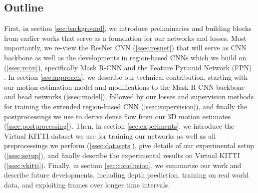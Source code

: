 \subsection{Outline}
First, in section \ref{sec:background}, we introduce preliminaries and building
blocks from earlier works that serve as a foundation for our networks and losses.
Most importantly, we re-view the ResNet CNN (\ref{ssec:resnet}) that will serve as CNN backbone
as well as the developments in region-based CNNs which we build on (\ref{ssec:rcnn}),
specifically Mask R-CNN and the Feature Pyramid Network (FPN) \cite{FPN}.
In section \ref{sec:approach}, we describe our technical contribution, starting
with our motion estimation model and modifications to the Mask R-CNN backbone and head networks (\ref{ssec:model}),
followed by our losses and supervision methods for training
the extended region-based CNN (\ref{ssec:supervision}), and
finally the postprocessings we use to derive dense flow from our 3D motion estimates
(\ref{ssec:postprocessing}).
Then, in section \ref{sec:experiments}, we introduce the Virtual KITTI dataset we use
for training our networks as well as all preprocessings we perform (\ref{ssec:datasets}),
give details of our experimental setup (\ref{ssec:setup}),
and finally describe the experimental results
on Virtual KITTI (\ref{ssec:vkitti}).
Finally, in section \ref{sec:conclusion}, we summarize our work and describe future
developments, including depth prediction, training on real world data,
and exploiting frames over longer time intervals.

